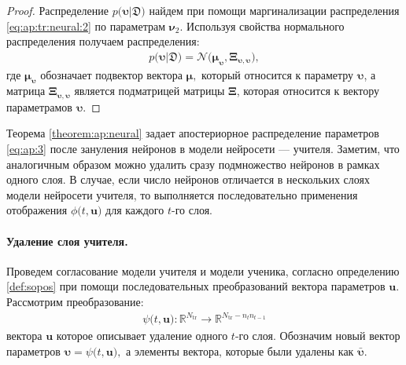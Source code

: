 \begin{proof}
Распределение $p\bigr(\bm{\upsilon}|\mathfrak{D}\bigr)$ найдем при помощи маргинализации распределения \eqref{eq:ap:tr:neural:2} по параметрам $\bm{\nu}_2.$ Используя свойства нормального распределения получаем распределения:
\[
\label{eq:ap:3}
\begin{aligned}
p\bigr(\bm{\upsilon}|\mathfrak{D}\bigr) = \mathcal{N}\bigr(\bm{\mu}_{\bm{\upsilon}},  \bm{\Xi}_{\bm{\upsilon}, \bm{\upsilon}}\bigr),
\end{aligned}
\]
где $\bm{\mu}_{\bm{\upsilon}}$ обозначает подвектор вектора $\bm{\mu},$ который относится к параметру $\bm{\upsilon}$, а матрица $\bm{\Xi}_{\bm{\upsilon}, \bm{\upsilon}}$ является подматрицей матрицы $\bm{\Xi}$, которая относится к вектору параметрамов $\bm{\upsilon}.$
\end{proof}

Теорема \ref{theorem:ap:neural} задает апостериорное распределение параметров \eqref{eq:ap:3} после зануления нейронов в модели нейросети --- учителя. Заметим, что аналогичным образом можно удалить сразу подмножество нейронов в рамках одного слоя. В случае, если число нейронов отличается в нескольких слоях модели нейросети учителя, то выполняется последовательно применения отображения $\phi\bigr(t, \mathbf{u}\bigr)$ для каждого $t$-го слоя.

\paragraph{Удаление слоя учителя.}
Проведем согласование модели учителя и модели ученика, согласно определению \ref{def:sopos} при помощи последовательных преобразований вектора параметров $\mathbf{u}$. Рассмотрим преобразование:
\[
\label{eq:ap:4}
\begin{aligned}
\psi\bigr(t, \mathbf{u}\bigr) : \mathbb{R}^{N_{\text{tr}}} \to \mathbb{R}^{N_{\text{tr}}-n_tn_{t-1}}
\end{aligned}
\]
вектора $\mathbf{u}$ которое описывает удаление одного $t$-го слоя.
Обозначим новый вектор параметров $\bm{\upsilon} = \psi\bigr(t, \mathbf{u}\bigr),$ а элементы вектора, которые были удалены как $\bar{\bm{\upsilon}}.$ 

